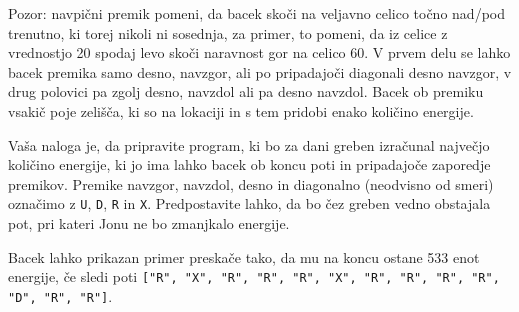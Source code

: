 \documentclass[arhiv]{../izpit}
\begin{document}
Pozor: navpični premik pomeni, da bacek skoči na veljavno celico točno nad/pod trenutno, ki torej nikoli ni sosednja, za primer, to pomeni, da iz celice z vrednostjo 20 spodaj levo skoči naravnost gor na celico 60. 
V prvem delu se lahko bacek 
premika samo desno, navzgor, ali po pripadajoči 
diagonali desno navzgor, v drug polovici pa zgolj desno, navzdol
ali pa desno navzdol. 
Bacek ob premiku vsakič poje zelišča, ki so 
na lokaciji in s tem pridobi enako količino energije.

Vaša naloga je, da pripravite program, ki bo za dani greben
izračunal največjo količino energije, ki jo ima lahko bacek 
ob koncu poti in pripadajoče zaporedje premikov. Premike navzgor, navzdol, desno in diagonalno (neodvisno od smeri) označimo z \verb|U|, \verb|D|, \verb|R| in \verb|X|.
Predpostavite lahko, da bo čez greben vedno obstajala pot, pri kateri Jonu ne bo zmanjkalo energije.

Bacek lahko prikazan primer preskače tako, da mu na koncu ostane 533 enot energije, če sledi poti \verb|["R", "X", "R", "R", "R", "X", "R", "R", "R", "R", "D", "R", "R"]|.
\end{document}
